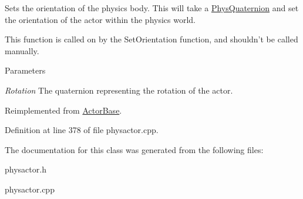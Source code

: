 Sets the orientation of the physics body. This will take a \hyperlink{classPhysQuaternion}{PhysQuaternion} and set the orientation of the actor within the physics world. \par
 This function is called on by the SetOrientation function, and shouldn't be called manually. 
\begin{DoxyParams}{Parameters}
\item[{\em Rotation}]The quaternion representing the rotation of the actor. \end{DoxyParams}


Reimplemented from \hyperlink{classActorBase_adf817bd5a7c562f31f6724a06a3a0f79}{ActorBase}.

Definition at line 378 of file physactor.cpp.

The documentation for this class was generated from the following files:\begin{DoxyCompactItemize}
\item 
physactor.h\item 
physactor.cpp\end{DoxyCompactItemize}
